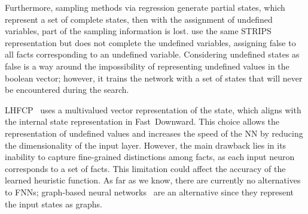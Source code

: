 Furthermore, sampling methods via regression generate partial states, which represent a set of complete states, then with the assignment of undefined variables, part of the sampling information is lost. \citet{yu2020learning} use the same STRIPS representation but does not complete the undefined variables, assigning false to all facts corresponding to an undefined variable. Considering undefined states as false is a way around the impossibility of representing undefined values in the boolean vector; however, it trains the network with a set of states that will never be encountered during the search.

LHFCP~\cite{geissmann2015learning} uses a multivalued \sas vector representation of the state, which aligns with the internal state representation in Fast~Downward. This choice allows the representation of undefined values and increases the speed of the NN by reducing the dimensionality of the input layer. However, the main drawback lies in its inability to capture fine-grained distinctions among facts, as each input neuron corresponds to a set of facts. This limitation could affect the accuracy of the learned heuristic function. As far as we know, there are currently no alternatives to FNNs; graph-based neural networks~\cite{shen2020learning} are an alternative since they represent the input states as graphs.
